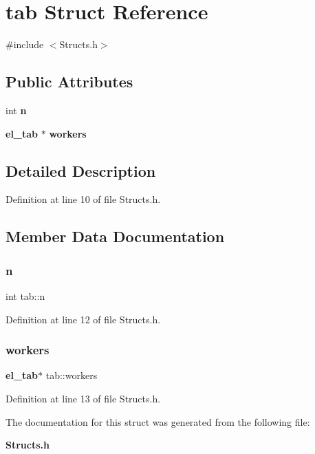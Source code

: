 \section{tab Struct Reference}
\label{structtab}


{\ttfamily \#include $<$Structs.\+h$>$}

\subsection*{Public Attributes}
\begin{DoxyCompactItemize}
\item 
int \textbf{ n}
\item 
\textbf{ el\+\_\+tab} $\ast$ \textbf{ workers}
\end{DoxyCompactItemize}


\subsection{Detailed Description}


Definition at line 10 of file Structs.\+h.



\subsection{Member Data Documentation}
\mbox{\label{structtab_a277daf05539090402f78eb4d17f401a2}} 
\subsubsection{n}
{\footnotesize\ttfamily int tab\+::n}



Definition at line 12 of file Structs.\+h.

\mbox{\label{structtab_a6212e72593b78ec4ff8b660327602e79}} 
\subsubsection{workers}
{\footnotesize\ttfamily \textbf{ el\+\_\+tab}$\ast$ tab\+::workers}



Definition at line 13 of file Structs.\+h.



The documentation for this struct was generated from the following file\+:\begin{DoxyCompactItemize}
\item 
\textbf{ Structs.\+h}\end{DoxyCompactItemize}
